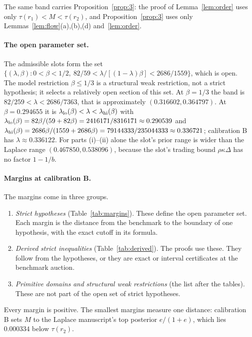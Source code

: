 \documentclass[11pt]{article}
\theoremstyle{definition}
\begin{document}
The same band carries Proposition~\ref{prop:3}: the proof of Lemma~\ref{lem:order} uses only
$\tau(r_1)<M<\tau(r_2)$, and Proposition~\ref{prop:3} uses only Lemmas~\ref{lem:flow}(a),(b),(d)
and~\ref{lem:order}.

\paragraph{The open parameter set.} The admissible slots form the set
$\{(\lambda,\beta):0<\beta<1/2,\ 82/59<\lambda/[(1-\lambda)\beta]<2686/1559\}$, which is open. The model restriction
$\beta\le1/3$ is a structural weak restriction, not a strict hypothesis; it selects a relatively open section of
this set. At $\beta=1/3$ the band is $82/259<\lambda<2686/7363$, that is approximately $(0.316602,0.364797)$. At
$\beta=0.294655$ it is $\lambda_{\rm lo}(\beta)<\lambda<\lambda_{\rm hi}(\beta)$ with
$\lambda_{\rm lo}(\beta)=82\beta/(59+82\beta)=2416171/8316171\approx0.290539$ and
$\lambda_{\rm hi}(\beta)=2686\beta/(1559+2686\beta)=79144333/235044333\approx0.336721$; calibration B has
$\lambda\approx0.336122$. For parts (i)--(ii) alone the slot's prior range is wider than the Laplace range
$(0.467850,0.538096)$, because the slot's trading bound $\rho\kappa\Delta$ has no factor $1-1/b$.

\paragraph{Margins at calibration B.} The margins come in three groups.
\begin{enumerate}
\item \emph{Strict hypotheses} (Table~\ref{tab:margins}). These define the open parameter set. Each margin is the
  distance from the benchmark to the boundary of one hypothesis, with the exact cutoff in its formula.
\item \emph{Derived strict inequalities} (Table~\ref{tab:derived}). The proofs use these. They follow from the
  hypotheses, or they are exact or interval certificates at the benchmark auction.
\item \emph{Primitive domains and structural weak restrictions} (the list after the tables). These are not part of
  the open set of strict hypotheses.
\end{enumerate}
Every margin is positive. The smallest margins measure one distance: calibration B sets $M$ to the Laplace
manuscript's top posterior $e/(1+e)$, which lies $0.000334$ below $\tau(r_2)$.
\end{document}
